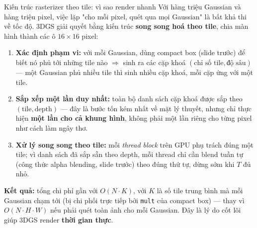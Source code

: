 
\begin{frame}{Kiến trúc rasterizer theo tile: vì sao render nhanh}
\scriptsize
Với hàng triệu Gaussian và hàng triệu pixel, việc lặp "cho mỗi pixel, quét qua mọi Gaussian" là bất khả thi về tốc độ.
3DGS giải quyết bằng kiến trúc \textbf{song song hoá theo tile}, chia màn hình thành các ô $16\times16$ pixel:
\begin{enumerate}\itemsep2pt
    \item \textbf{Xác định phạm vi:} với mỗi Gaussian, dùng compact box (slide trước) để biết nó phủ tới những tile
    nào $\Rightarrow$ sinh ra các cặp khoá $(\text{chỉ số tile}, \text{độ sâu})$ --- một Gaussian phủ nhiều tile thì sinh
    nhiều cặp khoá, mỗi cặp ứng với một tile.
    \item \textbf{Sắp xếp một lần duy nhất:} toàn bộ danh sách cặp khoá được sắp theo $(\text{tile}, \text{depth})$ ---
    đây là bước tốn kém nhất về mặt lý thuyết, nhưng chỉ thực hiện \textbf{một lần cho cả khung hình}, không phải một
    lần riêng cho từng pixel như cách làm ngây thơ.
    \item \textbf{Xử lý song song theo tile:} mỗi \emph{thread block} trên GPU phụ trách đúng một tile; vì danh sách đã
    sắp sẵn theo depth, mỗi thread chỉ cần blend tuần tự (công thức alpha blending, slide trước) theo đúng thứ tự, dừng
    sớm khi $T$ đủ nhỏ.
\end{enumerate}
\textbf{Kết quả:} tổng chi phí gần với $O(N\cdot K)$, với $K$ là số tile trung bình mà mỗi Gaussian chạm tới (bị chi
phối trực tiếp bởi \texttt{mult} của compact box) --- thay vì $O(N\cdot H\cdot W)$ nếu phải quét toàn ảnh cho mỗi
Gaussian. Đây là lý do cốt lõi giúp 3DGS render \textbf{thời gian thực}.
\end{frame}

